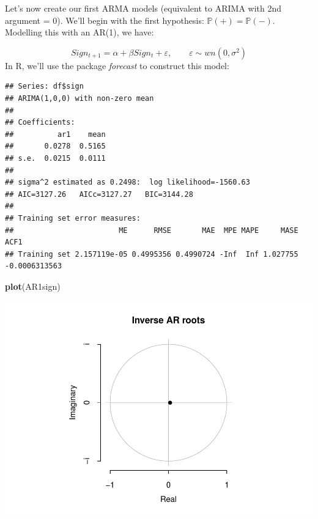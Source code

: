 \documentclass[11pt, a4paper]{report}
\newenvironment{Shaded}{\begin{snugshade}}{\end{snugshade}}
\newcommand{\DataTypeTok}[1]{\textcolor[rgb]{0.13,0.29,0.53}{#1}}
\newcommand{\DecValTok}[1]{\textcolor[rgb]{0.00,0.00,0.81}{#1}}
\newcommand{\KeywordTok}[1]{\textcolor[rgb]{0.13,0.29,0.53}{\textbf{#1}}}
\newcommand{\NormalTok}[1]{#1}
\newcommand{\OperatorTok}[1]{\textcolor[rgb]{0.81,0.36,0.00}{\textbf{#1}}}
\newcommand{\StringTok}[1]{\textcolor[rgb]{0.31,0.60,0.02}{#1}}
\theoremstyle{plain}
\theoremstyle{plain}
\theoremstyle{remark}
\begin{document}
Let's now create our first ARMA models (equivalent to ARIMA with 2nd
argument = 0). We'll begin with the first hypothesis:
\(\mathbb{P}(+) = \mathbb{P}(-).\) Modelling this with an AR(1), we
have:

\[Sign_{t+1} = \alpha + \beta Sign_t + \varepsilon, \hspace{2em} \varepsilon \sim wn(0, \sigma^2)\]
In R, we'll use the package \emph{forecast} to construct this model:

\begin{Shaded}
\end{Shaded}

\begin{verbatim}
## Series: df$sign 
## ARIMA(1,0,0) with non-zero mean 
## 
## Coefficients:
##          ar1    mean
##       0.0278  0.5165
## s.e.  0.0215  0.0111
## 
## sigma^2 estimated as 0.2498:  log likelihood=-1560.63
## AIC=3127.26   AICc=3127.27   BIC=3144.28
## 
## Training set error measures:
##                        ME      RMSE       MAE  MPE MAPE     MASE          ACF1
## Training set 2.157119e-05 0.4995356 0.4990724 -Inf  Inf 1.027755 -0.0006313563
\end{verbatim}

\begin{Shaded}
\begin{Highlighting}[]
\KeywordTok{plot}\NormalTok{(AR1sign)}
\end{Highlighting}
\end{Shaded}

\begin{center}\includegraphics{Econo2_P1_files/figure-latex/AR(1)-1} \end{center}
\end{document}
